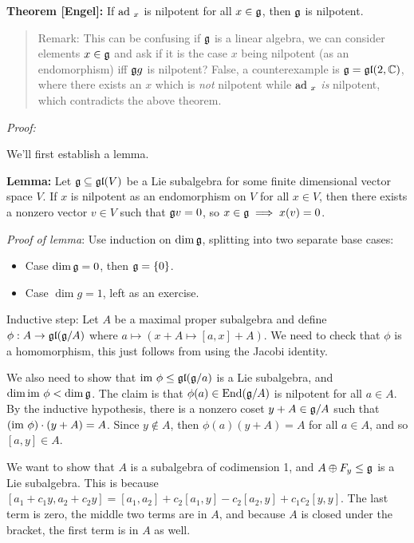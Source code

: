\textbf{Theorem {[}Engel{]}:} If \(\mathrm{ad}~_x\) is nilpotent for all
\(x\in {\mathfrak{g}}\), then \({\mathfrak{g}}\) is nilpotent.

\begin{quote}
Remark: This can be confusing if \({\mathfrak{g}}\) is a linear algebra, we can
consider elements \(x \in{\mathfrak{g}}\) and ask if it is the case \(x\) being
nilpotent (as an endomorphism) iff \({\mathfrak{g}} g\) is nilpotent? False, a
counterexample is \({\mathfrak{g}} = {\mathfrak{gl}}(2, {\mathbb{C}})\), where there exists an
\(x\) which is \emph{not} nilpotent while \(\mathrm{ad}~_x\) \emph{is} nilpotent,
which contradicts the above theorem.
\end{quote}

\emph{Proof:}

We'll first establish a lemma.

\textbf{Lemma:} Let \({\mathfrak{g}} \subseteq {\mathfrak{gl}}(V)\) be a Lie subalgebra
for some finite dimensional vector space \(V\). If \(x\) is nilpotent as
an endomorphism on \(V\) for all \(x\in V\), then there exists a nonzero
vector \(v\in V\) such that \({\mathfrak{g}} v =0\), so
\(x\in {\mathfrak{g}} \implies x(v) = 0\).

\emph{Proof of lemma}: Use induction on \(\dim {\mathfrak{g}}\), splitting into
two separate base cases:

\begin{itemize}
\tightlist
\item
  Case \(\dim {\mathfrak{g}} = 0\), then \({\mathfrak{g}} = \left\{{0}\right\}\).
\item
  Case \(\dim g = 1\), left as an exercise.
\end{itemize}

Inductive step: Let \(A\) be a maximal proper subalgebra and define
\(\phi: A \to {\mathfrak{gl}}({\mathfrak{g}}/A)\) where
\(a \mapsto (x + A \mapsto [a, x] + A)\). We need to check that \(\phi\)
is a homomorphism, this just follows from using the Jacobi identity.

We also need to show that \({\text{im}~} \phi \leq {\mathfrak{gl}}({\mathfrak{g}}/a)\) is a Lie
subalgebra, and \(\dim {\text{im}~} \phi < \dim {\mathfrak{g}}\). The claim is that
\(\phi(a) \in \mathrm{End}({\mathfrak{g}}/A)\) is nilpotent for all \(a\in A\).
By the inductive hypothesis, there is a nonzero coset
\(y + A \in {\mathfrak{g}}/A\) such that \(({\text{im}~} \phi) \cdot (y+A) = A\). Since
\(y\not\in A\), then \(\phi(a)(y+A) = A\) for all \(a\in A\), and so
\([a,y]\in A\).

We want to show that \(A\) is a subalgebra of codimension 1, and
\(A \oplus F_y \leq {\mathfrak{g}}\) is a Lie subalgebra. This is because
\([a_1 + c_1y, a_2 + c_2 y] = [a_1, a_2] + c_2[a_1, y] - c_2[a_2, y] + c_1c_2[y, y]\).
The last term is zero, the middle two terms are in \(A\), and because
\(A\) is closed under the bracket, the first term is in \(A\) as well.

